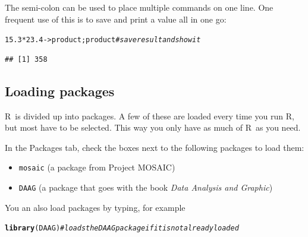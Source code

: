 \documentclass[twoside]{book}\usepackage[]{graphicx}\usepackage[]{xcolor}
\makeatletter
\newcommand{\hlnum}[1]{\textcolor[rgb]{0.686,0.059,0.569}{#1}}%
\newcommand{\hlcom}[1]{\textcolor[rgb]{0.678,0.584,0.686}{\textit{#1}}}%
\newcommand{\hlopt}[1]{\textcolor[rgb]{0,0,0}{#1}}%
\newcommand{\hlstd}[1]{\textcolor[rgb]{0.345,0.345,0.345}{#1}}%
\newcommand{\hlkwb}[1]{\textcolor[rgb]{0.69,0.353,0.396}{#1}}%
\newcommand{\hlkwd}[1]{\textcolor[rgb]{0.737,0.353,0.396}{\textbf{#1}}}%
\newenvironment{kframe}{%
 \def\at@end@of@kframe{}%
 \ifinner\ifhmode%
  \def\at@end@of@kframe{\end{minipage}}%
  \begin{minipage}{\columnwidth}%
 \fi\fi%
 \def\FrameCommand##1{\hskip\@totalleftmargin \hskip-\fboxsep
 \colorbox{shadecolor}{##1}\hskip-\fboxsep
     \hskip-\linewidth \hskip-\@totalleftmargin \hskip\columnwidth}%
 \MakeFramed {\advance\hsize-\width
   \@totalleftmargin\z@ \linewidth\hsize
   \@setminipage}}%
 {\par\unskip\endMakeFramed%
 \at@end@of@kframe}
\newenvironment{knitrout}{}{} %
\newcommand{\Rindex}[1]{\index{\texttt{#1}}}
\newcommand{\pkg}[1]{{\color{red!80!black}\texttt{#1}}\Rindex{#1}}
\def\R{{\sf R}}
\def\tab#1{{\sf #1}}
\newcounter{example}[section]
\makeatother
\begin{document}
The semi-colon can be used to place multiple commands on one line.  
One frequent use of this is to save and print a value all in one go:
\begin{knitrout}
\color{fgcolor}\begin{kframe}
\begin{alltt}
\hlnum{15.3} \hlopt{*} \hlnum{23.4} \hlkwb{->} \hlstd{product; product}    \hlcom{# save result and show it}
\end{alltt}
\begin{verbatim}
## [1] 358
\end{verbatim}
\end{kframe}
\end{knitrout}

\subsection{Loading packages}

\R\ is divided up into packages.  A few of these are loaded every time you
run \R, but most have to be selected.  This way you only have as much of \R\ as you
need.

In the \tab{Packages} tab, check the boxes next to the following packages to
load them:
\begin{itemize}
	\item \pkg{mosaic}  (a package from Project MOSAIC)
	\item \pkg{DAAG}  (a package that goes with the book \textit{Data Analysis and Graphic})
\end{itemize}
You an also load packages by typing, for example
\begin{knitrout}
\color{fgcolor}\begin{kframe}
\begin{alltt}
\hlkwd{library}\hlstd{(DAAG)}       \hlcom{# loads the DAAG package if it is not already loaded}
\end{alltt}
\end{kframe}
\end{knitrout}
\end{document}
